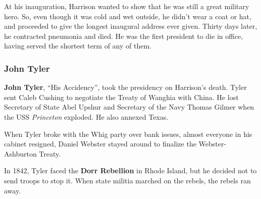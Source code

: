 At his inauguration, Harrison wanted to show that he was still a great military hero.
So, even though it was cold and wet outside, he didn't wear a coat or hat,
and proceeded to give the longest inaugural address ever given.
Thirty days later, he contracted pneumonia and died.
He was the first president to die in office, having served the shortest term of any of them.

\subsubsection*{John Tyler}

\textbf{John Tyler}, ``His Accidency'', took the presidency on Harrison's death.
Tyler sent Caleb Cushing to negotiate the Treaty of Wanghia with China.
He lost Secretary of State Abel Upshur and Secretary of the Navy Thomas Gilmer
when the USS \textit{Princeton} exploded.
He also annexed Texas.

When Tyler broke with the Whig party over bank issues, almost everyone in his cabinet resigned,
Daniel Webster stayed around to finalize the Webster-Ashburton Treaty.

In 1842, Tyler faced the \textbf{Dorr Rebellion} in Rhode Island,
but he decided not to send troops to stop it.
When state militia marched on the rebels, the rebels ran away.
